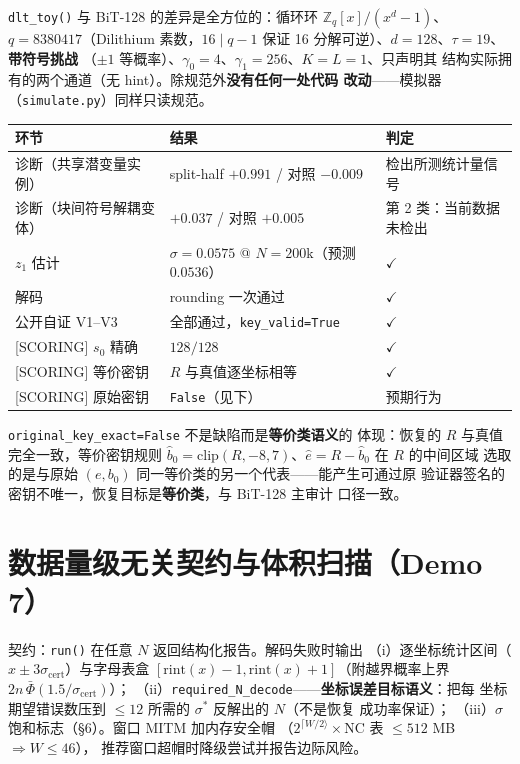 \documentclass[11pt,a4paper]{ctexart}
\begin{document}
\texttt{dlt\_toy()} 与 BiT-128 的差异是全方位的：循环环
$\mathbb{Z}_q[x]/(x^d-1)$、$q=8380417$（Dilithium 素数，$16\mid q-1$
保证 16 分解可逆）、$d=128$、$\tau=19$、\textbf{带符号挑战}
（$\pm1$ 等概率）、$\gamma_0=4$、$\gamma_1=256$、$K=L=1$、只声明其
结构实际拥有的两个通道（无 hint）。除规范外\textbf{没有任何一处代码
改动}——模拟器（\texttt{simulate.py}）同样只读规范。

\begin{table}[htbp]\centering\small
\begin{tabular}{@{}lll@{}}
\toprule
环节 & 结果 & 判定 \\
\midrule
诊断（共享潜变量实例） & split-half $+0.991$ / 对照 $-0.009$ & 检出所测统计量信号 \\
诊断（块间符号解耦变体） & $+0.037$ / 对照 $+0.005$ & 第 2 类：当前数据未检出 \\
$z_1$ 估计 & $\sigma=0.0575$ @ $N{=}200$k（预测 $0.0536$） & $\checkmark$ \\
解码 & rounding 一次通过 & $\checkmark$ \\
公开自证 V1--V3 & 全部通过，\texttt{key\_valid=True} & $\checkmark$ \\
{[SCORING]} $s_0$ 精确 & $128/128$ & $\checkmark$ \\
{[SCORING]} 等价密钥 & $R$ 与真值逐坐标相等 & $\checkmark$ \\
{[SCORING]} 原始密钥 & \texttt{False}（见下） & 预期行为 \\
\bottomrule
\end{tabular}
\end{table}

\texttt{original\_key\_exact=False} 不是缺陷而是\textbf{等价类语义}的
体现：恢复的 $R$ 与真值完全一致，等价密钥规则
$\hat b_0=\mathrm{clip}(R,-8,7)$、$\hat e=R-\hat b_0$ 在 $R$ 的中间区域
选取的是与原始 $(e,b_0)$ 同一等价类的另一个代表——能产生可通过原
验证器签名的密钥不唯一，恢复目标是\textbf{等价类}，与 BiT-128 主审计
口径一致。

\section{数据量级无关契约与体积扫描（Demo 7）}

契约：\texttt{run()} 在任意 $N$ 返回结构化报告。解码失败时输出
（i）逐坐标统计区间（$x\pm3\sigma_{\mathrm{cert}}$）与字母表盒
$[\mathrm{rint}(x)-1,\mathrm{rint}(x)+1]$（附越界概率上界
$2n\,\bar\Phi(1.5/\sigma_{\mathrm{cert}})$）；
（ii）\texttt{required\_N\_decode}——\textbf{坐标误差目标语义}：把每
坐标期望错误数压到 $\le12$ 所需的 $\sigma^*$ 反解出的 $N$（不是恢复
成功率保证）；
（iii）$\sigma$ 饱和标志（\S6）。窗口 MITM 加内存安全帽
（$2^{\lceil W/2\rangle}\times$NC 表 $\le512$ MB $\Rightarrow W\le46$），
推荐窗口超帽时降级尝试并报告边际风险。
\end{document}
